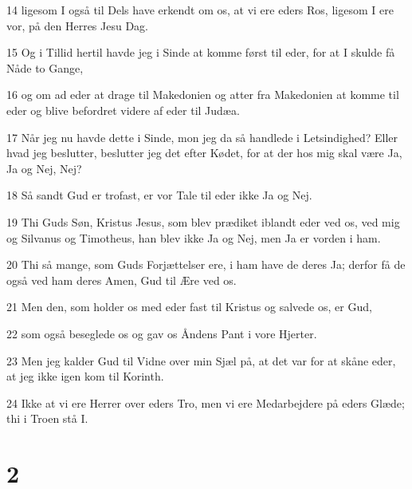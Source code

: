 \par 14 ligesom I også til Dels have erkendt om os, at vi ere eders Ros, ligesom I ere vor, på den Herres Jesu Dag.
\par 15 Og i Tillid hertil havde jeg i Sinde at komme først til eder, for at I skulde få Nåde to Gange,
\par 16 og om ad eder at drage til Makedonien og atter fra Makedonien at komme til eder og blive befordret videre af eder til Judæa.
\par 17 Når jeg nu havde dette i Sinde, mon jeg da så handlede i Letsindighed? Eller hvad jeg beslutter, beslutter jeg det efter Kødet, for at der hos mig skal være Ja, Ja og Nej, Nej?
\par 18 Så sandt Gud er trofast, er vor Tale til eder ikke Ja og Nej.
\par 19 Thi Guds Søn, Kristus Jesus, som blev prædiket iblandt eder ved os, ved mig og Silvanus og Timotheus, han blev ikke Ja og Nej, men Ja er vorden i ham.
\par 20 Thi så mange, som Guds Forjættelser ere, i ham have de deres Ja; derfor få de også ved ham deres Amen, Gud til Ære ved os.
\par 21 Men den, som holder os med eder fast til Kristus og salvede os, er Gud,
\par 22 som også beseglede os og gav os Åndens Pant i vore Hjerter.
\par 23 Men jeg kalder Gud til Vidne over min Sjæl på, at det var for at skåne eder, at jeg ikke igen kom til Korinth.
\par 24 Ikke at vi ere Herrer over eders Tro, men vi ere Medarbejdere på eders Glæde; thi i Troen stå I.

\chapter{2}

